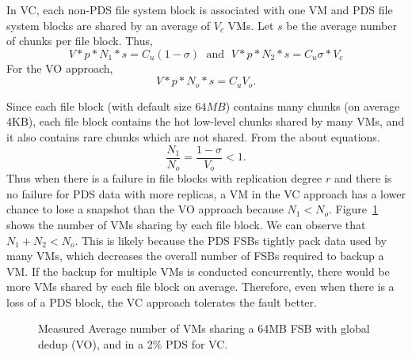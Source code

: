 In VC, each non-PDS file system block is associated with one VM
 and  PDS file system blocks are
shared by an average of $V_c$ VMs. Let $s$ be the average number of chunks per file block. Thus, 
\[
V *p*N_1 *s  = C_u (1-\sigma)\; \mbox{ and } \; 
V *p*N_2 *s  = C_u \sigma *V_c
\]
For the VO approach, 
\[
V *p*N_o *s  = C_u  V_o.
\]

Since each file block (with default size $64MB$) contains many chunks (on average 4KB),
each file block contains the hot low-level chunks shared by many VMs, and it also contains
rare chunks which are not shared.  From the about equations.
\[
\frac{N_1}{N_o}=  \frac{1-\sigma}{V_o}<1.
\] 
Thus when there is a failure in file blocks with replication degree $r$
and there is no failure for PDS data with more replicas,   a VM in
the VC approach has a lower chance to lose a snapshot than the VO approach because
$N_1<N_o$. 
Figure~\ref{fig:fsb-links} shows the number of VMs sharing by each file block.
We can observe that $N_1 +N_2 < N_o$. 
This is likely because the PDS FSBs tightly pack data used by many VMs, 
which decreases the overall number of FSBs required to backup a VM.
If  the backup for multiple VMs is conducted concurrently, there would be more
VMs shared  by each file block on average. Therefore,
even when there is a loss of a PDS block, the VC approach tolerates the fault better.

\begin{figure}[htbp]
  \centering
  \caption{Measured Average number of VMs sharing a 64MB FSB with global dedup (VO), and in a 2\% PDS for VC.}
  \label{fig:fsb-links}
\end{figure}

